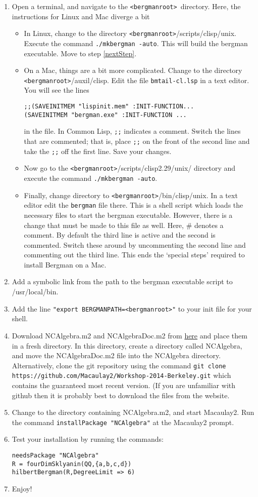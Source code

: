 \documentclass{article}
\newcommand{\bergroot}{\texttt{<bergmanroot>}}
\begin{document}
\begin{enumerate}
\item Open a terminal, and navigate to the \bergroot~directory.  Here, the instructions
for Linux and Mac diverge a bit
\begin{itemize}
\item In Linux, change to the directory \bergroot/scripts/clisp/unix.  Execute the command
\texttt{./mkbergman -auto}.  This will build the bergman executable.  Move to step \ref{nextStep}.
\item On a Mac, things are a bit more complicated.  Change to the directory \bergroot/auxil/clisp.
Edit the file \texttt{bmtail-cl.lsp} in a text editor.  You will see the lines
\begin{verbatim}
;;(SAVEINITMEM "lispinit.mem" :INIT-FUNCTION...
(SAVEINITMEM "bergman.exe" :INIT-FUNCTION ...
\end{verbatim}
in the file.  In Common Lisp, \verb.;;. indicates a comment.  Switch the lines that are commented;
that is, place \verb.;;. on the front of the second line and take the \verb.;;. off the first line.
Save your changes.
\item Now go to the \bergroot/scripts/clisp2.29/unix/ directory and execute the command \texttt{./mkbergman -auto}.
\item Finally, change directory to \bergroot/bin/clisp/unix.  In a text editor edit the \texttt{bergman} file there.
This is a shell script which loads the necessary files to start the bergman executable.  However, there
is a change that must be made to this file as well.  Here, \# denotes a comment.  By default
the third line is active and the second is commented.  Switch these around by uncommenting the second
line and commenting out the third line.  This ends the `special steps' required to install Bergman on a Mac.
\end{itemize}
\item \label{nextStep} Add a symbolic link from the path to the bergman executable script to /usr/local/bin.
\item Add the line \texttt{"export BERGMANPATH=\bergroot"} to your init file for your shell.
\item Download NCAlgebra.m2 and NCAlgebraDoc.m2 from \href{http://users.wfu.edu/moorewf}{here} and place them in a fresh directory.  In this
directory, create a directory called NCAlgebra, and move the NCAlgebraDoc.m2 file into the NCAlgebra directory.
Alternatively, clone the git repository using the command \texttt{git clone https://github.com/Macaulay2/Workshop-2014-Berkeley.git}
which contains the guaranteed most recent version. (If you are unfamiliar with github then it is probably best
to download the files from the website.
\item Change to the directory containing NCAlgebra.m2, and start Macaulay2.  Run the command
\texttt{installPackage "NCAlgebra"} at the Macaulay2 prompt.
\item Test your installation by running the commands:
\begin{verbatim}
needsPackage "NCAlgebra"
R = fourDimSklyanin(QQ,{a,b,c,d})
hilbertBergman(R,DegreeLimit => 6)
\end{verbatim}
\item Enjoy!
\end{enumerate}
\end{document}
